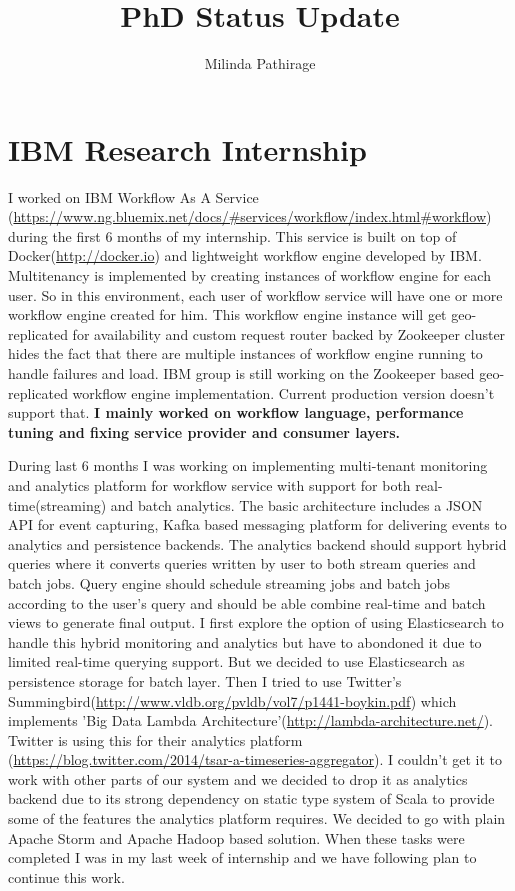 \documentclass{article}
\begin{document}
\title{PhD Status Update}
\author{Milinda Pathirage}

\maketitle

\section{IBM Research Internship}

I worked on IBM Workflow As A Service
(\url{https://www.ng.bluemix.net/docs/#services/workflow/index.html#workflow})
during the first 6 months of my internship. This service is built on
top of Docker(\url{http://docker.io}) and lightweight workflow engine
developed by IBM. Multitenancy is implemented by creating instances of
workflow engine for each user. So in this environment, each user of
workflow service will have one or more workflow engine created for
him. This workflow engine instance will get geo-replicated for
availability and custom request router backed by Zookeeper cluster
hides the fact that there are multiple instances of workflow engine
running to handle failures and load. IBM group is still working on the
Zookeeper based geo-replicated workflow engine implementation. Current
production version doesn't support that. \textbf{I mainly worked on workflow
language, performance tuning and fixing service provider and consumer
layers.}

During last 6 months I was working on implementing multi-tenant
monitoring and analytics platform for workflow service with support
for both real-time(streaming) and batch analytics. The basic
architecture includes a JSON API for event capturing, Kafka based
messaging platform for delivering events to analytics and persistence
backends. The analytics backend should support hybrid queries where it
converts queries written by user to both stream queries and batch
jobs. Query engine should schedule streaming jobs and batch jobs
according to the user's query and should be able combine real-time and
batch views to generate final output. I first explore the option of
using Elasticsearch to handle this hybrid monitoring and analytics but
have to abondoned it due to limited real-time querying support. But we
decided to use Elasticsearch as persistence storage for batch
layer. Then I tried to use Twitter's
Summingbird(\url{http://www.vldb.org/pvldb/vol7/p1441-boykin.pdf})
which implements 'Big Data Lambda
Architecture'(\url{http://lambda-architecture.net/}). Twitter is using
this for their analytics platform
(\url{https://blog.twitter.com/2014/tsar-a-timeseries-aggregator}).
I couldn't get it to work with other parts of our system and we
decided to drop it as analytics backend due to its
strong dependency on static type system of Scala to provide some of
the features the analytics platform requires. We decided to go with
plain Apache Storm and Apache Hadoop based solution. When these tasks
were completed I was in my last week of internship and we have
following plan to continue this work.
\end{document}
